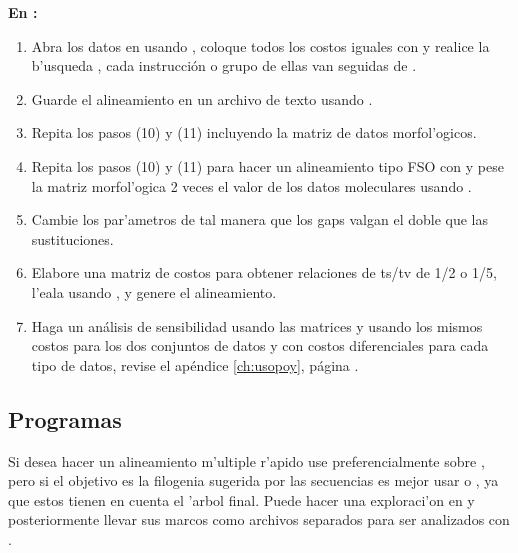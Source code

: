 \textbf{En :}
\begin{enumerate}
\item Abra los datos en  usando , coloque todos los costos iguales con  y realice la b'usqueda    , cada instrucci\'on o grupo de ellas van seguidas de .
\item Guarde el alineamiento en un archivo de texto usando .
\item Repita los pasos (10) y (11) incluyendo la matriz de datos morfol'ogicos.
\item Repita los pasos (10) y (11) para hacer un alineamiento tipo FSO con  y pese la matriz morfol'ogica 2 veces el valor de los datos moleculares usando .
\item Cambie los par'ametros de tal manera que los gaps valgan el doble que las sustituciones.
\item Elabore una matriz de costos para obtener relaciones de ts/tv de  1/2 o  1/5, l'eala usando , y genere el alineamiento.
\item Haga un an\'alisis de sensibilidad usando las matrices  y  usando los mismos costos para los dos conjuntos de datos y con costos diferenciales para cada tipo de datos, revise el ap\'endice \ref{ch:usopoy}, p\'agina \pageref{ch:usopoy}. 
\end{enumerate}

\subsection{Programas}
Si desea hacer un alineamiento m'ultiple r'apido use preferencialmente  sobre , pero si el objetivo es la filogenia sugerida por las secuencias es mejor usar  o , ya que estos tienen en cuenta el 'arbol final. Puede hacer una  exploraci'on en  y posteriormente llevar sus marcos como archivos separados para ser analizados con .

